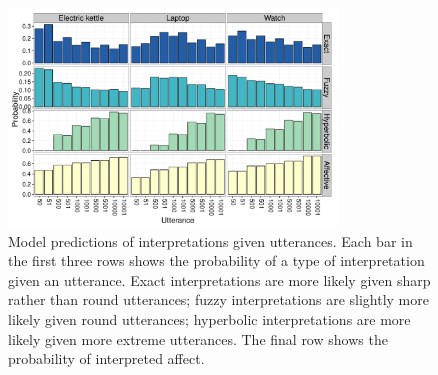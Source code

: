 \documentclass{pnastwo}
\begin{document}
\begin{article}
\begin{figure}[t]
\centering
\begin{minipage}[b]{.49\textwidth}
\includegraphics[width=8.7cm]{figure1-revised.pdf}
\caption{Model predictions of interpretations given utterances. Each bar in the first three rows shows the probability of a type of interpretation given an utterance. Exact interpretations are more likely given sharp rather than round utterances; fuzzy interpretations are slightly more likely given round utterances; hyperbolic  interpretations are more likely given more extreme utterances. The final row shows the probability of interpreted affect.} 
\label{model_effects}
\end{minipage}\hfill
\end{figure}
\end{article}
\end{document}
